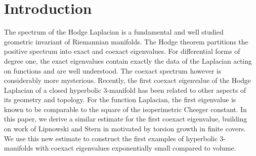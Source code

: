  \section{Introduction}
The spectrum of the Hodge Laplacian is a fundamental and well studied geometric invariant of Riemannian manifolds. The Hodge theorem partitions the positive spectrum into exact and coexact eigenvalues. For differential forms of degree one, the exact eigenvalues contain exactly the data of the Laplacian acting on functions and are well understood. The coexact spectrum however is considerably more mysterious. Recently, the first coexact eigenvalue of the Hodge Laplacian of a closed hyperbolic 3-manifold has been related to other aspects of its geometry and topology. For the function Laplacian, the first eigenvalue is known to be comparable to the square of the isoperimetric Cheeger constant. In this paper, we derive a similar estimate for the first coexact eigenvalue, building on work of Lipnowski and Stern in \cite{LS} motivated by torsion growth in finite covers. We use this new estimate to construct the first examples of hyperbolic 3-manifolds with coexact eigenvalues exponentially small compared to volume.


